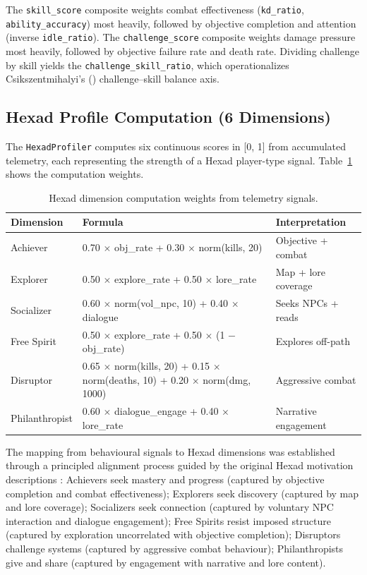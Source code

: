 \documentclass[12pt,a4paper]{report}
\begin{document}
The \texttt{skill\_score} composite weights combat effectiveness (\texttt{kd\_ratio}, \texttt{ability\_accuracy}) most heavily, followed by objective completion and attention (inverse \texttt{idle\_ratio}). The \texttt{challenge\_score} composite weights damage pressure most heavily, followed by objective failure rate and death rate. Dividing challenge by skill yields the \texttt{challenge\_skill\_ratio}, which operationalizes Csikszentmihalyi's (\citeyear{csikszentmihalyi1990flow}) challenge--skill balance axis.

\subsection{Hexad Profile Computation (6 Dimensions)}

The \texttt{HexadProfiler} computes six continuous scores in [0, 1] from accumulated telemetry, each representing the strength of a Hexad player-type signal. Table~\ref{tab:hexad} shows the computation weights.

\begin{table}[H]
\centering
\caption{Hexad dimension computation weights from telemetry signals.}
\label{tab:hexad}
\small
\begin{tabular}{@{}p{2.5cm} p{7cm} p{3.5cm}@{}}
\toprule
\textbf{Dimension} & \textbf{Formula} & \textbf{Interpretation} \\
\midrule
Achiever & 0.70 $\times$ obj\_rate + 0.30 $\times$ norm(kills, 20) & Objective + combat \\
Explorer & 0.50 $\times$ explore\_rate + 0.50 $\times$ lore\_rate & Map + lore coverage \\
Socializer & 0.60 $\times$ norm(vol\_npc, 10) + 0.40 $\times$ dialogue & Seeks NPCs + reads \\
Free Spirit & 0.50 $\times$ explore\_rate + 0.50 $\times$ (1 $-$ obj\_rate) & Explores off-path \\
Disruptor & 0.65 $\times$ norm(kills, 20) + 0.15 $\times$ norm(deaths, 10) + 0.20 $\times$ norm(dmg, 1000) & Aggressive combat \\
Philanthropist & 0.60 $\times$ dialogue\_engage + 0.40 $\times$ lore\_rate & Narrative engagement \\
\bottomrule
\end{tabular}
\end{table}

The mapping from behavioural signals to Hexad dimensions was established through a principled alignment process guided by the original Hexad motivation descriptions \citep{tondello2016hexad}: Achievers seek mastery and progress (captured by objective completion and combat effectiveness); Explorers seek discovery (captured by map and lore coverage); Socializers seek connection (captured by voluntary NPC interaction and dialogue engagement); Free Spirits resist imposed structure (captured by exploration uncorrelated with objective completion); Disruptors challenge systems (captured by aggressive combat behaviour); Philanthropists give and share (captured by engagement with narrative and lore content).
\end{document}

